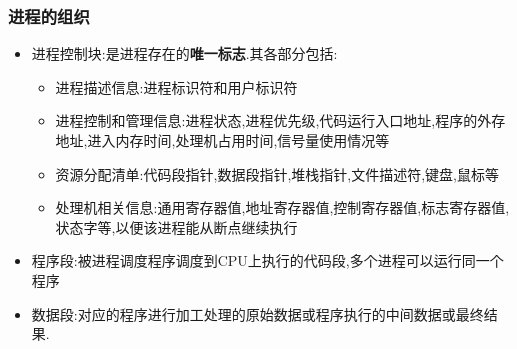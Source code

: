 \documentclass{ctexart}
\begin{document}
\subsubsection{进程的组织}
\begin{itemize}
	\item 进程控制块:是进程存在的\textbf{唯一标志}.其各部分包括:
	\begin{itemize}
		\item 进程描述信息:进程标识符和用户标识符
		\item 进程控制和管理信息:进程状态,进程优先级,代码运行入口地址,程序的外存地址,进入内存时间,处理机占用时间,信号量使用情况等
		\item 资源分配清单:代码段指针,数据段指针,堆栈指针,文件描述符,键盘,鼠标等
		\item 处理机相关信息:通用寄存器值,地址寄存器值,控制寄存器值,标志寄存器值,状态字等,以便该进程能从断点继续执行
	\end{itemize}
	\item 程序段:被进程调度程序调度到CPU上执行的代码段,多个进程可以运行同一个程序
	\item 数据段:对应的程序进行加工处理的原始数据或程序执行的中间数据或最终结果.
\end{itemize}
\end{document}
